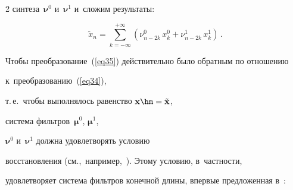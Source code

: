 \begin{multicols}{2}
синтеза~$\boldsymbol\nu^0$ и~$\boldsymbol\nu^1$ и~сложим результаты:



\vspace*{2pt}



\noindent

\begin{equation}

\label{eq35}

\tilde{x}_n =\sum\limits_{k=-\infty}^{+\infty}

\left(\nu_{n-2k}^{0}\,x_k^0 + \nu_{n-2k}^{1}\,x_k^1 \right) \,.

\end{equation}



\vspace*{-2pt}



\noindent

Чтобы преобразование~(\ref{eq35}) действительно было обратным по отношению 

к~преобразованию~(\ref{eq34}),

т.\,е.\ чтобы выполнялось равенство $\mathbf{x}\hm=\tilde{\mathbf{x}}$,

система фильтров~$\boldsymbol\mu^0$, $\boldsymbol\mu^1$, 

$\boldsymbol\nu^0$ и~$\boldsymbol\nu^1$ должна удовлетворять условию 

восстановления (см.,~например,~\cite{b06}). Этому условию, в~част\-ности, 

удовлетворяет система фильтров конечной длины, впервые предложенная в~\cite{b07}:



\pagebreak



\end{multicols}



\noindent

